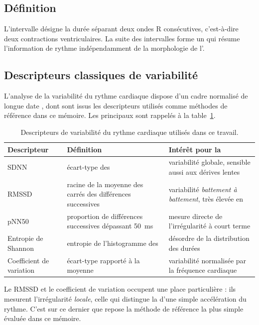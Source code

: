 \subsection{Définition}
L'intervalle \RR{} désigne la durée séparant deux ondes R consécutives, c'est-à-dire deux contractions ventriculaires. La suite des intervalles \RR{} forme un  qui résume l'information de rythme indépendamment de la morphologie de l'\ECG{}.

\subsection{Descripteurs classiques de variabilité}
L'analyse de la variabilité du rythme cardiaque dispose d'un cadre normalisé de longue date \cite{taskforce1996hrv}, dont sont issus les descripteurs utilisés comme méthodes de référence dans ce mémoire. Les principaux sont rappelés à la table~\ref{tab:soa:hrv}.

\begin{table}[H]
  \centering
  \caption{Descripteurs de variabilité du rythme cardiaque utilisés dans ce travail.}
  \label{tab:soa:hrv}
  \begin{tabular}{llp{6.2cm}}
    \toprule
    \textbf{Descripteur} & \textbf{Définition} & \textbf{Intérêt pour la \FA{}} \\
    \midrule
    SDNN   & écart-type des \RR{} & variabilité globale, sensible aussi aux dérives lentes \\
    RMSSD  & racine de la moyenne des carrés des différences successives & variabilité \emph{battement à battement}, très élevée en \FA{} \\
    pNN50  & proportion de différences successives dépassant \SI{50}{\milli\second} & mesure directe de l'irrégularité à court terme \\
    Entropie de Shannon & entropie de l'histogramme des \RR{} & désordre de la distribution des durées \\
    Coefficient de variation & écart-type rapporté à la moyenne & variabilité normalisée par la fréquence cardiaque \\
    \bottomrule
  \end{tabular}
\end{table}

Le RMSSD et le coefficient de variation occupent une place particulière : ils mesurent l'irrégularité \emph{locale}, celle qui distingue la \FA{} d'une simple accélération du rythme. C'est sur ce dernier que repose la méthode de référence la plus simple évaluée dans ce mémoire.

